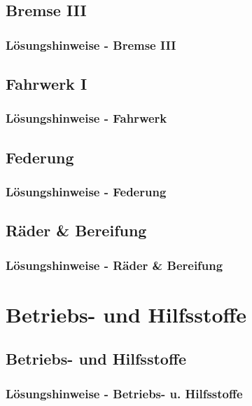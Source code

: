 \chapter{Bremse III}
\section{Lösungshinweise - Bremse III}
 \newpage

\chapter{Fahrwerk I}
 \newpage
\section{Lösungshinweise - Fahrwerk}
 \newpage

\chapter{Federung}
\section{Lösungshinweise - Federung}
 \newpage

\chapter{Räder \& Bereifung}
\section{Lösungshinweise - Räder \& Bereifung}
 \newpage




\part{Betriebs- und Hilfsstoffe}
\chapter{Betriebs- und Hilfsstoffe}
 \newpage
\section{Lösungshinweise - Betriebs- u. Hilfsstoffe}
 \newpage




